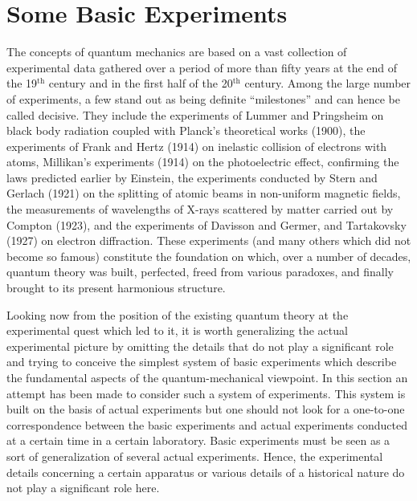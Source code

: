 \documentclass[a4paper,sfsidenotes,colorlinks=true]{tufte-book}
\numberwithin{equation}{section}
\numberwithin{figure}{section}
\begin{document}
\section{Some Basic Experiments}
\label{sec-07}
The  concepts of quantum mechanics are based on a vast collection of experimental data gathered over a period of more than fifty years at the end of the 19$^{\mathrm{th}}$ century and in the first half of the 20$^{\mathrm{th}}$ century. Among the large number of experiments, a few stand out as being definite ``milestones'' and can hence be called decisive. They include the experiments of Lummer and Pringsheim on black body radiation coupled with Planck's theoretical works (1900), the experiments of Frank and Hertz (1914) on inelastic collision of electrons with atoms, Millikan's experiments (1914) on the photoelectric effect, confirming the laws predicted earlier by Einstein, the experiments conducted by Stern and Gerlach (1921) on the splitting of atomic beams in non-uniform magnetic fields, the measurements of wavelengths of X-rays scattered by matter carried out by Compton (1923), and the experiments of Davisson and Germer, and Tartakovsky (1927) on electron diffraction. These experiments (and many others which did not become so famous) constitute the foundation on which, over a number of decades, quantum theory was built, perfected, freed from various paradoxes, and finally brought to its present harmonious structure. 

Looking now from the position of the existing quantum theory at the experimental quest which led to it, it is worth generalizing the actual experimental picture by omitting the details that do not play a significant role and trying to conceive the simplest system of basic experiments which describe the fundamental aspects of the quantum-mechanical viewpoint. In this section an attempt has been made to consider such a system of experiments. This system is built on the basis of actual experiments but one should not look for a one-to-one correspondence between the basic experiments and actual experiments conducted at a certain time in a certain laboratory. Basic experiments must be seen as a sort of generalization of several actual experiments. Hence, the experimental details concerning a certain apparatus or various details of a historical nature do not play a significant role here. 
\end{document}
